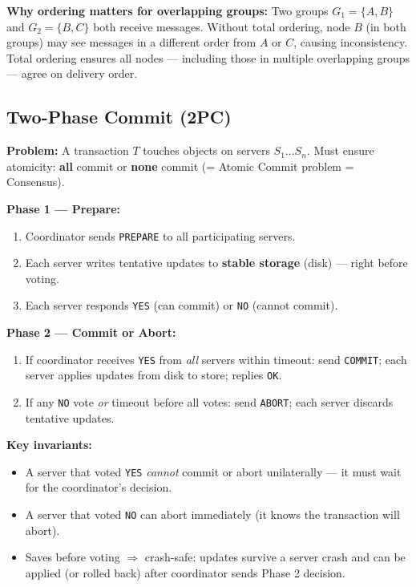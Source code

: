 \documentclass[12pt,a4paper]{article}
\begin{document}
\textbf{Why ordering matters for overlapping groups:}
Two groups $G_1 = \{A, B\}$ and $G_2 = \{B, C\}$ both receive messages.
Without total ordering, node $B$ (in both groups) may see messages in a different order
from $A$ or $C$, causing inconsistency. Total ordering ensures all nodes — including
those in multiple overlapping groups — agree on delivery order.

\subsection{Two-Phase Commit (2PC)}
\textbf{Problem:} A transaction $T$ touches objects on servers $S_1 \ldots S_n$.
Must ensure atomicity: \textbf{all} commit or \textbf{none} commit (= Atomic Commit problem = Consensus).

\textbf{Phase 1 — Prepare:}
\begin{enumerate}
  \item Coordinator sends \texttt{PREPARE} to all participating servers.
  \item Each server writes tentative updates to \textbf{stable storage} (disk) — right before voting.
  \item Each server responds \texttt{YES} (can commit) or \texttt{NO} (cannot commit).
\end{enumerate}

\textbf{Phase 2 — Commit or Abort:}
\begin{enumerate}
  \item If coordinator receives \texttt{YES} from \emph{all} servers within timeout:
        send \texttt{COMMIT}; each server applies updates from disk to store; replies \texttt{OK}.
  \item If any \texttt{NO} vote \emph{or} timeout before all votes:
        send \texttt{ABORT}; each server discards tentative updates.
\end{enumerate}

\textbf{Key invariants:}
\begin{itemize}
  \item A server that voted \texttt{YES} \emph{cannot} commit or abort unilaterally
        — it must wait for the coordinator's decision.
  \item A server that voted \texttt{NO} can abort immediately (it knows the transaction will abort).
  \item Saves before voting $\Rightarrow$ crash-safe: updates survive a server crash and
        can be applied (or rolled back) after coordinator sends Phase 2 decision.
\end{itemize}
\end{document}
